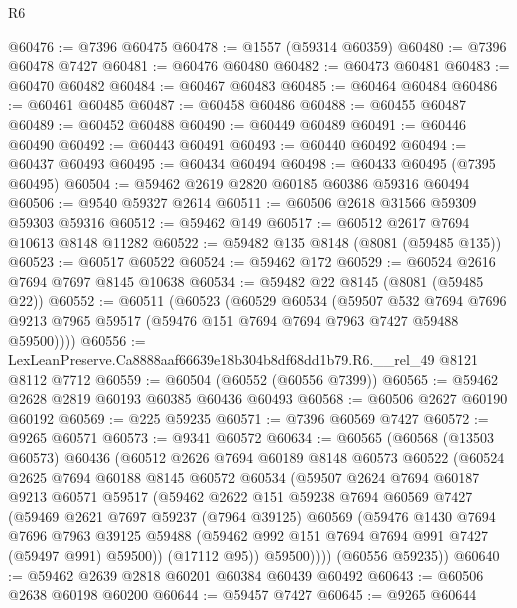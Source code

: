 \begin{lexlean}{R6}
\begin{coremodule}
@60476 := @7396 @60475
@60478 := @1557 (@59314 @60359)
@60480 := @7396 @60478 @7427
@60481 := @60476 @60480
@60482 := @60473 @60481
@60483 := @60470 @60482
@60484 := @60467 @60483
@60485 := @60464 @60484
@60486 := @60461 @60485
@60487 := @60458 @60486
@60488 := @60455 @60487
@60489 := @60452 @60488
@60490 := @60449 @60489
@60491 := @60446 @60490
@60492 := @60443 @60491
@60493 := @60440 @60492
@60494 := @60437 @60493
@60495 := @60434 @60494
@60498 := @60433 @60495 (@7395 @60495)
@60504 := @59462 @2619 @2820 @60185 @60386 @59316 @60494
@60506 := @9540 @59327 @2614
@60511 := @60506 @2618 @31566 @59309 @59303 @59316
@60512 := @59462 @149
@60517 := @60512 @2617 @7694 @10613 @8148 @11282
@60522 := @59482 @135 @8148 (@8081 (@59485 @135))
@60523 := @60517 @60522
@60524 := @59462 @172
@60529 := @60524 @2616 @7694 @7697 @8145 @10638
@60534 := @59482 @22 @8145 (@8081 (@59485 @22))
@60552 := @60511
    (@60523
      (@60529
        @60534
        (@59507
          @532
          @7694
          @7696
          @9213
          @7965
          @59517
          (@59476 @151 @7694 @7694 @7963 @7427 @59488 @59500))))
@60556 := LexLeanPreserve.Ca8888aaf66639e18b304b8df68dd1b79.R6.__rel_49 @8121 @8112 @7712
@60559 := @60504 (@60552 (@60556 @7399))
@60565 := @59462 @2628 @2819 @60193 @60385 @60436 @60493
@60568 := @60506 @2627 @60190 @60192
@60569 := @225 @59235
@60571 := @7396 @60569 @7427
@60572 := @9265 @60571
@60573 := @9341 @60572
@60634 := @60565
    (@60568
      (@13503 @60573)
      @60436
      (@60512
        @2626
        @7694
        @60189
        @8148
        @60573
        @60522
        (@60524
          @2625
          @7694
          @60188
          @8145
          @60572
          @60534
          (@59507
            @2624
            @7694
            @60187
            @9213
            @60571
            @59517
            (@59462
              @2622
              @151
              @59238
              @7694
              @60569
              @7427
              (@59469
                @2621
                @7697
                @59237
                (@7964 @39125)
                @60569
                (@59476
                  @1430
                  @7694
                  @7696
                  @7963
                  @39125
                  @59488
                  (@59462 @992 @151 @7694 @7694 @991 @7427 (@59497 @991) @59500))
                (@17112 @95))
              @59500))))
      (@60556 @59235))
@60640 := @59462 @2639 @2818 @60201 @60384 @60439 @60492
@60643 := @60506 @2638 @60198 @60200
@60644 := @59457 @7427
@60645 := @9265 @60644

\end{coremodule}
\end{lexlean}
